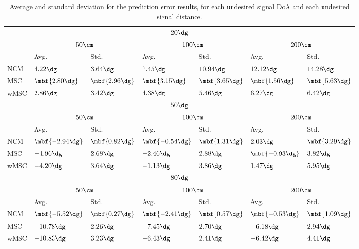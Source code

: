 \begin{table}[!t]
	\centering
	\renewcommand{\arraystretch}{1.4}
	\begin{tabular}{l l l l l l l}
		\multicolumn{7}{c}{$20\dg$} \\
		\hhline{=======}
		& \multicolumn{2}{c}{$50\cm$} & \multicolumn{2}{c}{$100\cm$} & \multicolumn{2}{c}{$200\cm$} \\
		\hline
		& Avg. 				 & Std. 					& Avg. 				  & Std. 				 & Avg. 					& Std. \\
		\hline
		NCM    & $4.22\dg$         & $3.64\dg$         & $7.45\dg$         & $10.94\dg$        & $12.12\dg$        & $14.28\dg$       \\
		MSC    & $\mbf{2.80\dg}$   & $\mbf{2.96\dg}$   & $\mbf{3.15\dg}$   & $\mbf{3.65\dg}$   & $\mbf{1.56\dg}$   & $\mbf{5.63\dg}$  \\
		wMSC   & $2.86\dg$         & $3.42\dg$         & $4.38\dg$         & $5.46\dg$         & $6.27\dg$         & $6.42\dg$        \\[1em]
		\multicolumn{7}{c}{$50\dg$} \\
		\hhline{=======}
		& \multicolumn{2}{c}{$50\cm$} & \multicolumn{2}{c}{$100\cm$} & \multicolumn{2}{c}{$200\cm$} \\
		\hline
		& Avg. & Std. & Avg. & Std. & Avg. & Std. \\
		\hline
		NCM    & $\mbf{-2.94\dg}$  & $\mbf{0.82\dg}$   & $\mbf{-0.54\dg}$  & $\mbf{1.31\dg}$   & $2.03\dg$         & $\mbf{3.29\dg}$  \\
		MSC    & $-4.96\dg$        & $2.68\dg$         & $-2.46\dg$        & $2.88\dg$         & $\mbf{-0.93\dg}$  & $3.82\dg$        \\
		wMSC   & $-4.20\dg$        & $3.64\dg$         & $-1.13\dg$        & $3.86\dg$         & $1.47\dg$         & $5.95\dg$        \\[1em]
		\multicolumn{7}{c}{$80\dg$} \\
		\hhline{=======}
		& \multicolumn{2}{c}{$50\cm$} & \multicolumn{2}{c}{$100\cm$} & \multicolumn{2}{c}{$200\cm$} \\
		\hline
		& Avg. & Std. & Avg. & Std. & Avg. & Std. \\
		\hline
		NCM    & $\mbf{-5.52\dg}$  & $\mbf{0.27\dg}$   & $\mbf{-2.41\dg}$  & $\mbf{0.57\dg}$   & $\mbf{-0.53\dg}$  & $\mbf{1.09\dg}$  \\
		MSC    & $-10.78\dg$       & $2.26\dg$         & $-7.45\dg$        & $2.70\dg$         & $-6.18\dg$        & $2.94\dg$        \\
		wMSC   & $-10.83\dg$       & $3.23\dg$         & $-6.43\dg$        & $2.41\dg$         & $-6.42\dg$        & $4.41\dg$        
	\end{tabular}
	\caption{Average and standard deviation for the prediction error results, for each undesired signal DoA and each undesired signal distance.}
	\label{tab:sec3:error__each_DOA__each_dist}
\end{table}